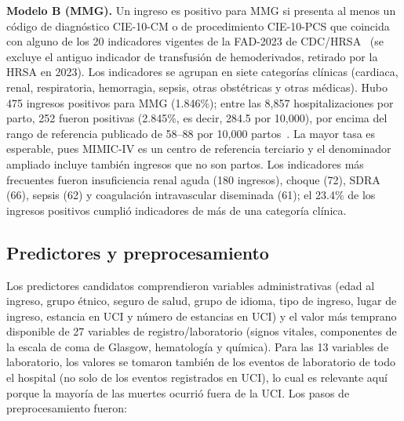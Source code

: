 \documentclass[healthcare,article,submit,pdftex,moreauthors]{Definitions/mdpi_es}
\begin{document}
\textbf{Modelo B (MMG).} Un ingreso es positivo para MMG si presenta al menos un código de
diagnóstico CIE-10-CM o de procedimiento CIE-10-PCS que coincida con alguno de los 20
indicadores vigentes de la FAD-2023 de CDC/HRSA~\cite{CDC2023SMM,HRSA2023FAD,Nebraska2024SMM}
(se excluye el antiguo indicador de transfusión de hemoderivados, retirado por la HRSA en 2023).
Los indicadores se agrupan en siete categorías clínicas (cardiaca, renal, respiratoria,
hemorragia, sepsis, otras obstétricas y otras médicas). Hubo 475 ingresos positivos para MMG
(1.846\%); entre las 8{,}857 hospitalizaciones por parto, 252 fueron positivas (2.845\%, es
decir, 284.5 por 10{,}000), por encima del rango de referencia publicado de 58--88 por 10{,}000
partos~\cite{Nebraska2024SMM}. La mayor tasa es esperable, pues MIMIC-IV es un centro de
referencia terciario y el denominador ampliado incluye también ingresos que no son partos.
Los indicadores más frecuentes fueron insuficiencia renal aguda (180 ingresos), choque (72),
SDRA (66), sepsis (62) y coagulación intravascular diseminada (61); el 23.4\% de los ingresos
positivos cumplió indicadores de más de una categoría clínica.

\subsection{Predictores y preprocesamiento}
Los predictores candidatos comprendieron variables administrativas (edad al ingreso, grupo
étnico, seguro de salud, grupo de idioma, tipo de ingreso, lugar de ingreso, estancia en UCI y
número de estancias en UCI) y el valor más temprano disponible de 27 variables de
registro/laboratorio (signos vitales, componentes de la escala de coma de Glasgow, hematología
y química). Para las 13 variables de laboratorio, los valores se tomaron también de los eventos
de laboratorio de todo el hospital (no solo de los eventos registrados en UCI), lo cual es
relevante aquí porque la mayoría de las muertes ocurrió fuera de la UCI. Los pasos de
preprocesamiento fueron:
\end{document}
